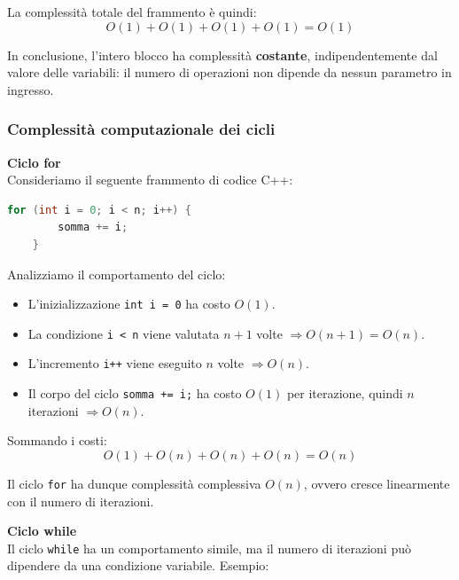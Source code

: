 La complessità totale del frammento è quindi:
\[
O(1) + O(1) + O(1) + O(1) = O(1)
\]

In conclusione, l’intero blocco ha complessità \textbf{costante}, indipendentemente dal valore delle variabili:  
il numero di operazioni non dipende da nessun parametro in ingresso.











\vspace{1cm}
\subsubsection{Complessità computazionale dei cicli}


\textbf{Ciclo for} \\

Consideriamo il seguente frammento di codice C++:

\begin{lstlisting}[language=C++]
	for (int i = 0; i < n; i++) {
		somma += i;
	}
\end{lstlisting}

Analizziamo il comportamento del ciclo:

\begin{itemize}
	\item L'inizializzazione \texttt{int i = 0} ha costo $O(1)$.
	\item La condizione \texttt{i < n} viene valutata $n + 1$ volte $\Rightarrow O(n + 1) = O(n)$.
	\item L'incremento \texttt{i++} viene eseguito $n$ volte $\Rightarrow O(n)$.
	\item Il corpo del ciclo \texttt{somma += i;} ha costo $O(1)$ per iterazione, quindi $n$ iterazioni $\Rightarrow O(n)$.
\end{itemize}

Sommando i costi:
\[
O(1) + O(n) + O(n) + O(n) = O(n)
\]

Il ciclo \texttt{for} ha dunque complessità complessiva \textbf{$O(n)$}, ovvero cresce linearmente con il numero di iterazioni.

\vspace{1cm}

\textbf{Ciclo while} \\

Il ciclo \texttt{while} ha un comportamento simile, ma il numero di iterazioni può dipendere da una condizione variabile.  
Esempio:


